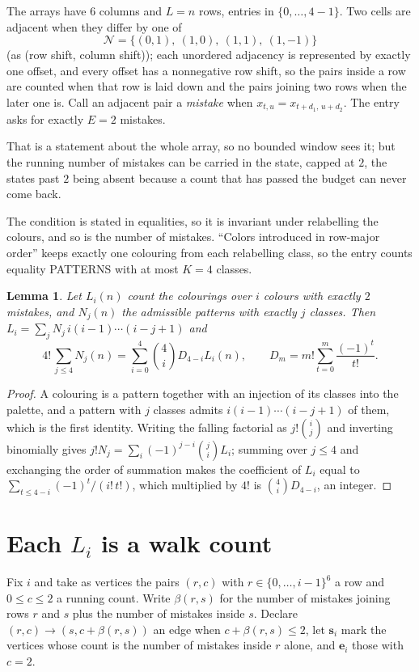 \documentclass[11pt,a4paper]{article}
\theoremstyle{plain}
\newtheorem{lemma}[theorem]{Lemma}
\theoremstyle{definition}
\begin{document}
The arrays have $6$ columns and $L=n$ rows, entries in $\{0,\dots,4-1\}$.
Two cells are adjacent when they differ by one of
\[
\mathcal N=\{(0,1),\ (1,0),\ (1,1),\ (1,-1)\}
\]
(as (row shift, column shift)); each unordered adjacency is represented by exactly one
offset, and every offset has a nonnegative row shift, so the pairs inside a row are
counted when that row is laid down and the pairs joining two rows when the later one
is. Call an adjacent pair a \emph{mistake} when $x_{t,u}=x_{t+d_1,\,u+d_2}$. The entry asks for exactly
$E=2$ mistakes.

That is a statement about the whole array, so no bounded window sees it; but the running
number of mistakes can be carried in the state, capped at $2$, the states past $2$ being
absent because a count that has passed the budget can never come back.

The condition is stated in equalities, so it is invariant under relabelling the colours, and
so is the number of mistakes. ``Colors introduced in row-major order'' keeps exactly one
colouring from each relabelling class, so the entry counts equality PATTERNS with at most
$K=4$ classes.

\begin{lemma}\label{lem:inv}
Let $L_i(n)$ count the colourings over $i$ colours with exactly $2$ mistakes, and $N_j(n)$
the admissible patterns with exactly $j$ classes. Then
$L_i=\sum_j N_j\,i(i-1)\cdots(i-j+1)$ and
\[
4!\,\sum_{j\le4}N_j(n)=\sum_{i=0}^{4}\binom{4}{i}D_{4-i}L_i(n),
\qquad D_m=m!\sum_{t=0}^{m}\frac{(-1)^t}{t!} .
\]
\end{lemma}

\begin{proof}
A colouring is a pattern together with an injection of its classes into the palette, and a
pattern with $j$ classes admits $i(i-1)\cdots(i-j+1)$ of them, which is the first identity.
Writing the falling factorial as $j!\binom{i}{j}$ and inverting binomially gives
$j!N_j=\sum_i(-1)^{j-i}\binom{j}{i}L_i$; summing over $j\le4$ and exchanging the order
of summation makes the coefficient of $L_i$ equal to $\sum_{t\le4-i}(-1)^t/(i!\,t!)$,
which multiplied by $4!$ is $\binom{4}{i}D_{4-i}$, an integer.
\end{proof}

\section{Each $L_i$ is a walk count}

Fix $i$ and take as vertices the pairs $(r,c)$ with $r\in\{0,\dots,i-1\}^{6}$ a row
and $0\le c\le2$ a running count. Write $\beta(r,s)$ for the number of mistakes joining
rows $r$ and $s$ plus the number of mistakes inside $s$. Declare $(r,c)\to(s,c+\beta(r,s))$
an edge when $c+\beta(r,s)\le2$, let $\mathbf{s}_i$ mark the vertices whose count is the
number of mistakes inside $r$ alone, and $\mathbf{e}_i$ those with $c=2$.
\end{document}
